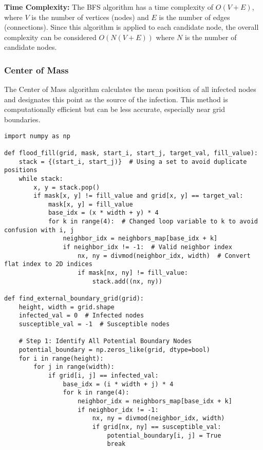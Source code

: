 \textbf{Time Complexity:} The BFS algorithm has a time complexity of \(O(V + E)\), where \(V\) is the number of vertices (nodes) and \(E\) is the number of edges (connections). Since this algorithm is applied to each candidate node, the overall complexity can be considered \(O(N(V + E))\) where \(N\) is the number of candidate nodes.

\subsubsection{Center of Mass}
The Center of Mass algorithm calculates the mean position of all infected nodes and designates this point as the source of the infection. This method is computationally efficient but can be less accurate, especially near grid boundaries.

\begin{lstlisting}[caption=Center of Mass Algorithm, label=lst:center-of-mass]
import numpy as np

def flood_fill(grid, mask, start_i, start_j, target_val, fill_value):
    stack = {(start_i, start_j)}  # Using a set to avoid duplicate positions
    while stack:
        x, y = stack.pop()
        if mask[x, y] != fill_value and grid[x, y] == target_val:
            mask[x, y] = fill_value
            base_idx = (x * width + y) * 4
            for k in range(4):  # Changed loop variable to k to avoid confusion with i, j
                neighbor_idx = neighbors_map[base_idx + k]
                if neighbor_idx != -1:  # Valid neighbor index
                    nx, ny = divmod(neighbor_idx, width)  # Convert flat index to 2D indices
                    if mask[nx, ny] != fill_value:
                        stack.add((nx, ny))

def find_external_boundary_grid(grid):
    height, width = grid.shape
    infected_val = 0  # Infected nodes
    susceptible_val = -1  # Susceptible nodes

    # Step 1: Identify All Potential Boundary Nodes
    potential_boundary = np.zeros_like(grid, dtype=bool)
    for i in range(height):
        for j in range(width):
            if grid[i, j] == infected_val:
                base_idx = (i * width + j) * 4
                for k in range(4):
                    neighbor_idx = neighbors_map[base_idx + k]
                    if neighbor_idx != -1:
                        nx, ny = divmod(neighbor_idx, width)
                        if grid[nx, ny] == susceptible_val:
                            potential_boundary[i, j] = True
                            break


\end{lstlisting}
